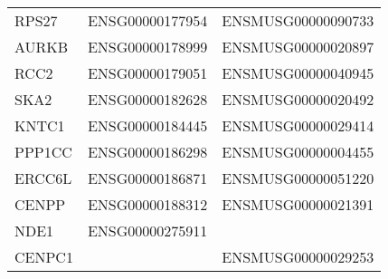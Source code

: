 \begin{longtable}{lll}
    RPS27 & ENSG00000177954 & ENSMUSG00000090733 \\
    AURKB & ENSG00000178999 & ENSMUSG00000020897 \\
    RCC2 & ENSG00000179051 & ENSMUSG00000040945 \\
    SKA2 & ENSG00000182628 & ENSMUSG00000020492 \\
    KNTC1 & ENSG00000184445 & ENSMUSG00000029414 \\
    PPP1CC & ENSG00000186298 & ENSMUSG00000004455 \\
    ERCC6L & ENSG00000186871 & ENSMUSG00000051220 \\
    CENPP & ENSG00000188312 & ENSMUSG00000021391 \\
    NDE1 & ENSG00000275911 &  \\
    CENPC1 &  & ENSMUSG00000029253 \\
    \bottomrule
\end{longtable}
